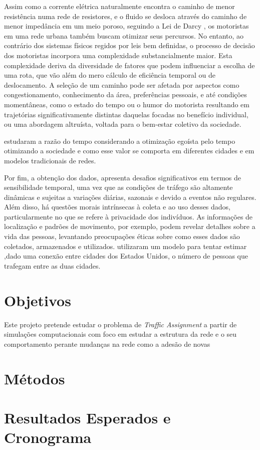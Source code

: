 \documentclass{article}
\begin{document}
Assim como a corrente elétrica naturalmente encontra o caminho de menor resistência numa rede de resistores, e o fluido se desloca através do caminho de menor impedância em um meio poroso, seguindo a Lei de Darcy \citep{darcy}, os motoristas em uma rede urbana também buscam otimizar seus percursos. No entanto, ao contrário dos sistemas físicos regidos por leis bem definidas, o processo de decisão dos motoristas incorpora uma complexidade substancialmente maior. Esta complexidade deriva da diversidade de fatores que podem influenciar a escolha de uma rota, que vão além do mero cálculo de eficiência temporal ou de deslocamento. A seleção de um caminho pode ser afetada por aspectos como congestionamento, conhecimento da área, preferências pessoais, e até condições momentâneas, como o estado do tempo ou o humor do motorista resultando em trajetórias significativamente distintas daquelas focadas no benefício individual, ou uma abordagem altruísta, voltada para o bem-estar coletivo da sociedade. 

\citet{Anarchy} estudaram a razão do tempo considerando a otimização egoísta pelo tempo otimizando a sociedade e como esse valor se comporta em diferentes cidades e em modelos tradicionais de redes. 


Por fim, a obtenção dos dados, apresenta desafios significativos em termos de sensibilidade temporal, uma vez que as condições de tráfego são altamente dinâmicas e sujeitas a variações diárias, sazonais e devido a eventos não regulares. Além disso, há questões morais intrínsecas à coleta e ao uso desses dados, particularmente no que se refere à privacidade dos indivíduos. As informações de localização e padrões de movimento, por exemplo, podem revelar detalhes sobre a vida das pessoas, levantando preocupações éticas sobre como esses dados são coletados, armazenados e utilizados. \citet{Simini2012} utilizaram um modelo para tentar estimar ,dado uma conexão entre cidades dos Estados Unidos, o número de pessoas que trafegam entre as duas cidades.


\newpage
\section{Objetivos}

Este projeto pretende estudar o problema de \textit{Traffic Assignment} a partir de simulações computacionais com foco em estudar a estrutura da rede e o seu comportamento perante mudanças na rede como a adesão de novas 

\newpage

\section{Métodos}

\newpage

\section{Resultados Esperados e Cronograma}

\newpage


\end{document}

